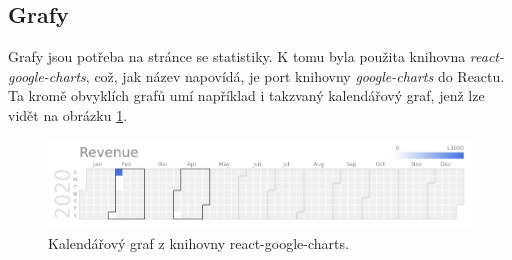 \newpage
\subsection{Grafy}

Grafy jsou potřeba na stránce se statistiky. K tomu byla použita knihovna \textit{react-google-charts},
což, jak název napovídá, je port knihovny \textit{google-charts} do Reactu. Ta kromě obvyklích grafů umí
například i takzvaný kalendářový graf, jenž lze vidět na obrázku \ref{fig:google_charts}.

\begin{figure}[!htb] \centering
  \includegraphics[width=145mm]{../img/google_charts.png}
  \caption{Kalendářový graf z knihovny react-google-charts.}
  \label{fig:google_charts}
\end{figure}
